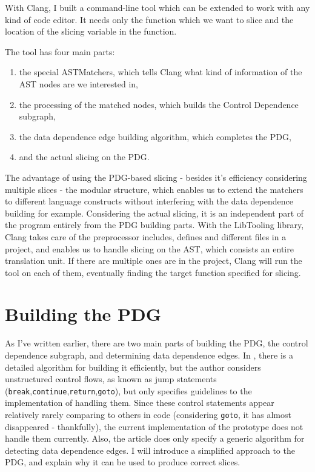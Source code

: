 \documentclass[oneside,12pt,a4paper]{book}
\begin{document}
With Clang, I built a command-line tool which can be extended to work with any kind of code editor. It needs only the function which we want to slice and the location of the slicing variable in the function. 

The tool has four main parts: 
\begin{enumerate}
\item the special ASTMatchers, which tells Clang what kind of information of the AST nodes are we interested in,
\item the processing of the matched nodes, which builds the Control Dependence subgraph,
\item the data dependence edge building algorithm, which completes the PDG,
\item and the actual slicing on the PDG.
\end{enumerate}

The advantage of using the PDG-based slicing - besides it's efficiency considering multiple slices - the modular structure, which enables us to extend the matchers to different language constructs without interfering with the data dependence building for example. Considering the actual slicing, it is an independent part of the program entirely from the PDG building parts. With the LibTooling library, Clang takes care of the preprocessor includes, defines and different files in a project, and enables us to handle slicing on the AST, which consists an entire translation unit. If there are multiple ones are in the project, Clang will run the tool on each of them, eventually finding the target function specified for slicing.

\section{Building the PDG}

As I've written earlier, there are two main parts of building the PDG, the control dependence subgraph, and determining data dependence edges. In \cite{efficient-pdg}, there is a detailed algorithm for building it efficiently, but the author considers unstructured control flows, as known as jump statements (\texttt{break},\texttt{continue},\texttt{return},\texttt{goto}), but only specifies guidelines to the implementation of handling them. Since these control statements appear relatively rarely comparing to others in code (considering \texttt{goto}, it has almost disappeared - thankfully), the current implementation of the prototype does not handle them currently.
Also, the article does only specify a generic algorithm for detecting data dependence edges. I will introduce a simplified approach to the PDG, and explain why it can be used to produce correct slices.
\end{document}
